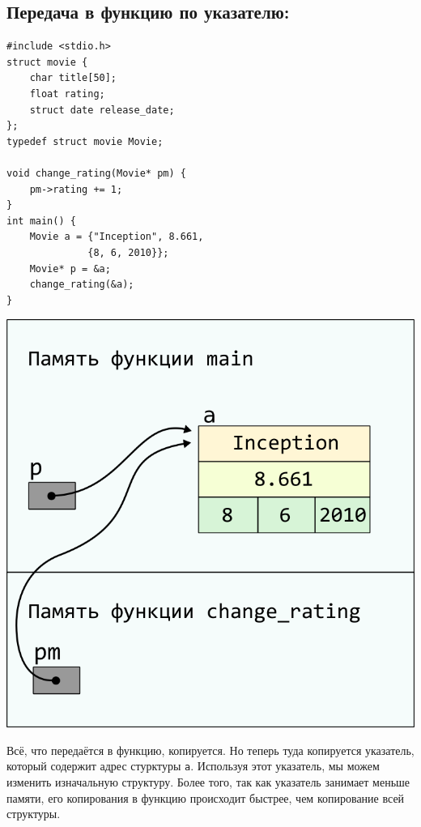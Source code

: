 \documentclass{article}
\begin{document}
\subsection*{Передача в функцию по указателю:}
\begin{multicols}{2}
\begin{lstlisting}
#include <stdio.h>
struct movie {
    char title[50];
    float rating;
    struct date release_date;
};
typedef struct movie Movie;

void change_rating(Movie* pm) {
    pm->rating += 1;
}
int main() {
    Movie a = {"Inception", 8.661, 
              {8, 6, 2010}};
    Movie* p = &a;
    change_rating(&a);
}
\end{lstlisting}
\columnbreak
\begin{center}
\includegraphics[scale=0.86]{../images/pointer_schemes/function_by_pointer.png}
\end{center}
\end{multicols}
Всё, что передаётся в функцию, копируется. Но теперь туда копируется указатель, который содержит
адрес стурктуры \texttt{a}. Используя этот указатель, мы можем изменить изначальную структуру. Более того, так как указатель занимает меньше памяти, его копирования в функцию происходит быстрее, чем копирование всей структуры.
\end{document}
